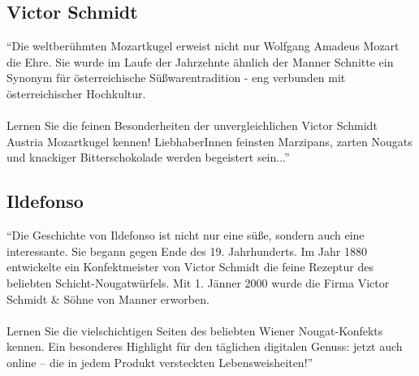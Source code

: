 \subsection{Victor Schmidt}
\enquote{Die weltberühmten Mozartkugel erweist nicht nur Wolfgang Amadeus Mozart die Ehre. Sie wurde im Laufe der Jahrzehnte ähnlich der Manner Schnitte ein Synonym für österreichische Süßwarentradition - eng verbunden mit österreichischer Hochkultur.\\\\
Lernen Sie die feinen Besonderheiten der unvergleichlichen Victor Schmidt Austria Mozartkugel kennen! LiebhaberInnen feinsten Marzipans, zarten Nougats und knackiger Bitterschokolade werden begeistert sein...}\cite{josef_manner_marken}

\subsection{Ildefonso}
\enquote{Die Geschichte von Ildefonso ist nicht nur eine süße, sondern auch eine interessante. Sie begann gegen Ende des 19. Jahrhunderts. Im Jahr 1880 entwickelte ein Konfektmeister von Victor Schmidt die feine Rezeptur des beliebten Schicht-Nougatwürfels. Mit 1. Jänner 2000 wurde die Firma Victor Schmidt \& Söhne von Manner erworben.\\\\
Lernen Sie die vielschichtigen Seiten des beliebten Wiener Nougat-Konfekts kennen. Ein besonderes Highlight für den täglichen digitalen Genuss: jetzt auch online – die in jedem Produkt versteckten Lebensweisheiten!}\cite{josef_manner_marken}

